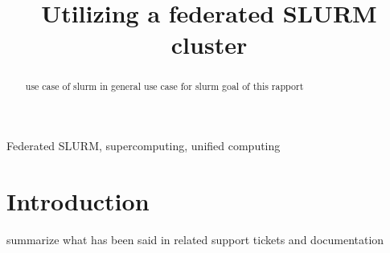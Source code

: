 \documentclass[conference]{IEEEtran}
\begin{document}
\title{Utilizing a federated SLURM cluster}

\author{
}

\maketitle

\begin{abstract}
use case of slurm in general
use case for slurm
goal of this rapport
\end{abstract}

\begin{IEEEkeywords}
Federated SLURM, supercomputing, unified computing
\end{IEEEkeywords}

\section{Introduction}
summarize what has been said in related support tickets and documentation








\end{document}
